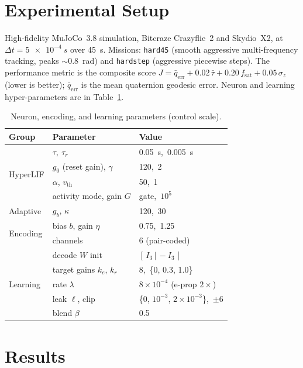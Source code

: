 \documentclass[conference]{IEEEtran}
\begin{document}
\section{Experimental Setup}
High-fidelity MuJoCo~3.8 simulation, Bitcraze Crazyflie~2 and Skydio~X2, at
$\Delta t=\SI{5e-4}{s}$ over \SI{45}{s}. Missions: \texttt{hard45} (smooth
aggressive multi-frequency tracking, peaks $\sim$\SI{0.8}{rad}) and
\texttt{hardstep} (aggressive piecewise steps). The performance metric is the
composite score $J=\bar q_\mathrm{err}+0.02\,\bar\tau+0.20\,f_\mathrm{sat}
+0.05\,\sigma_z$ (lower is better); $\bar q_\mathrm{err}$ is the mean quaternion
geodesic error. Neuron and learning hyper-parameters are in
Table~\ref{tab:params}.

\begin{table}[t]
\caption{Neuron, encoding, and learning parameters (control scale).}
\label{tab:params}
\centering\small
\begin{tabular}{@{}lll@{}}
\toprule
Group & Parameter & Value \\
\midrule
\multirow{4}{*}{HyperLIF}
  & $\tau,\ \tau_r$ & \SI{0.05}{s},\ \SI{0.005}{s} \\
  & $g_0$ (reset gain), $\gamma$ & 120,\ 2 \\
  & $\alpha$, $v_\mathrm{th}$ & 50,\ 1 \\
  & activity mode, gain $G$ & gate,\ $10^5$ \\
\midrule
Adaptive & $g_b$, $\kappa$ & 120,\ 30 \\
\midrule
\multirow{2}{*}{Encoding}
  & bias $b$, gain $\eta$ & 0.75,\ 1.25 \\
  & channels & 6 (pair-coded) \\
\midrule
\multirow{5}{*}{Learning}
  & decode $W$ init & $[\,I_3\,|\,{-}I_3\,]$ \\
  & target gains $k_e$, $k_r$ & 8,\ \{0, 0.3, 1.0\} \\
  & rate $\lambda$ & $8\!\times\!10^{-4}$ (e-prop $2\times$) \\
  & leak $\ell$, clip & \{0, $10^{-3}$, $2\!\times\!10^{-3}$\},\ $\pm6$ \\
  & blend $\beta$ & 0.5 \\
\bottomrule
\end{tabular}
\end{table}

\section{Results}
\end{document}
